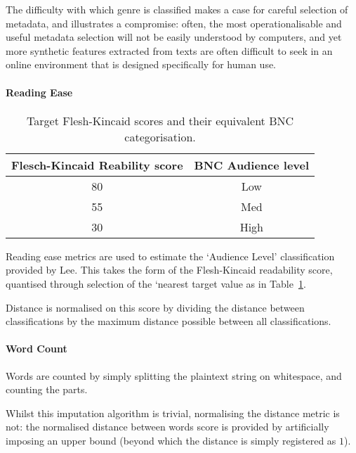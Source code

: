
The difficulty with which genre is classified makes a case for careful selection of metadata, and illustrates a compromise: often, the most operationalisable and useful metadata selection will not be easily understood by computers, and yet more synthetic features extracted from texts are often difficult to seek in an online environment that is designed specifically for human use.


\paragraph{Reading Ease}

\begin{table}[h]
    \center
    \begin{tabular}{|c|c|}
        \hline 
        Flesch-Kincaid Reability score & BNC Audience level \\
        \hline 
        80 & Low \\
        55 & Med \\
        30 & High \\
        \hline
    \end{tabular}
    \caption{Target Flesh-Kincaid scores and their equivalent BNC categorisation.}
    \label{tab:rebuilding:method:fkscore}
\end{table}

Reading ease metrics are used to estimate the `Audience Level' classification provided by Lee.  This takes the form of the Flesh-Kincaid readability score, quantised through selection of the `nearest target value as in Table~\ref{tab:rebuilding:method:fkscore}.

Distance is normalised on this score by dividing the distance between classifications by the maximum distance possible between all classifications.




\paragraph{Word Count}
Words are counted by simply splitting the plaintext string on whitespace, and counting the parts.

Whilst this imputation algorithm is trivial, normalising the distance metric is not: the normalised distance between words score is provided by artificially imposing an upper bound (beyond which the distance is simply registered as $1$).





